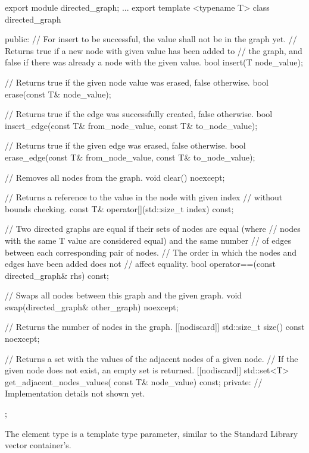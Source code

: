 \begin{cpp}
export module directed_graph;
...
export template <typename T>
class directed_graph
{
    public:
        // For insert to be successful, the value shall not be in the graph yet.
        // Returns true if a new node with given value has been added to
        // the graph, and false if there was already a node with the given value.
        bool insert(T node_value);

        // Returns true if the given node value was erased, false otherwise.
        bool erase(const T& node_value);

        // Returns true if the edge was successfully created, false otherwise.
        bool insert_edge(const T& from_node_value, const T& to_node_value);

        // Returns true if the given edge was erased, false otherwise.
        bool erase_edge(const T& from_node_value, const T& to_node_value);

        // Removes all nodes from the graph.
        void clear() noexcept;

        // Returns a reference to the value in the node with given index
        // without bounds checking.
        const T& operator[](std::size_t index) const;

        // Two directed graphs are equal if their sets of nodes are equal (where
        // nodes with the same T value are considered equal) and the same number
        // of edges between each corresponding pair of nodes.
        // The order in which the nodes and edges have been added does not
        // affect equality.
        bool operator==(const directed_graph& rhs) const;

        // Swaps all nodes between this graph and the given graph.
        void swap(directed_graph& other_graph) noexcept;

        // Returns the number of nodes in the graph.
        [[nodiscard]] std::size_t size() const noexcept;

        // Returns a set with the values of the adjacent nodes of a given node.
        // If the given node does not exist, an empty set is returned.
        [[nodiscard]] std::set<T> get_adjacent_nodes_values(
            const T& node_value) const;
    private:
        // Implementation details not shown yet.
};
\end{cpp}

The element type is a template type parameter, similar to the Standard Library vector container’s.

